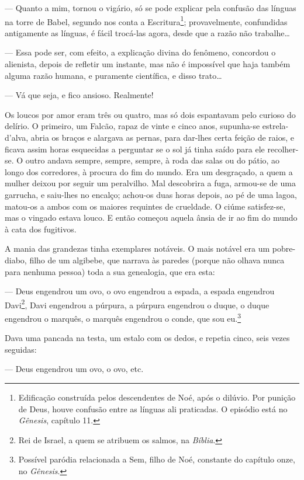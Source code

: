 --- Quanto a mim, tornou o vigário, só se pode explicar pela confusão
das línguas na torre de Babel, segundo nos conta a Escritura\footnote{Edificação
  construída pelos descendentes de Noé, após o dilúvio. Por punição de
  Deus, houve confusão entre as línguas ali praticadas. O episódio está
  no \emph{Gênesis}, capítulo 11.}; provavelmente, confundidas
antigamente as línguas, é fácil trocá-las agora, desde que a razão não
trabalhe\ldots{}

--- Essa pode ser, com efeito, a explicação divina do fenômeno,
concordou o alienista, depois de refletir um instante, mas não é
impossível que haja também alguma razão humana, e puramente científica,
e disso trato\ldots{}

--- Vá que seja, e fico ansioso. Realmente!

Os loucos por amor eram três ou quatro, mas só dois espantavam pelo
curioso do delírio. O primeiro, um Falcão, rapaz de vinte e cinco anos,
supunha-se estrela-d'alva, abria os braços e alargava as pernas, para
dar-lhes certa feição de raios, e ficava assim horas esquecidas a
perguntar se o sol já tinha saído para ele recolher-se. O outro andava
sempre, sempre, sempre, à roda das salas ou do pátio, ao longo dos
corredores, à procura do fim do mundo. Era um desgraçado, a quem a
mulher deixou por seguir um peralvilho. Mal descobrira a fuga, armou-se
de uma garrucha, e saiu-lhes no encalço; achou-os duas horas depois, ao
pé de uma lagoa, matou-os a ambos com os maiores requintes de crueldade.
O ciúme satisfez-se, mas o vingado estava louco. E então começou aquela
ânsia de ir ao fim do mundo à cata dos fugitivos.

A mania das grandezas tinha exemplares notáveis. O mais notável era um
pobre-diabo, filho de um algibebe, que narrava às paredes (porque não
olhava nunca para nenhuma pessoa) toda a sua genealogia, que era esta:

--- Deus engendrou um ovo, o ovo engendrou a espada, a espada engendrou
Davi\footnote{Rei de Israel, a quem se atribuem os salmos, na
  \emph{Bíblia}.}, Davi engendrou a púrpura, a púrpura engendrou o
duque, o duque engendrou o marquês, o marquês engendrou o conde, que sou
eu.\footnote{Possível paródia relacionada a Sem, filho de Noé, constante
  do capítulo onze, no \emph{Gênesis}.}

Dava uma pancada na testa, um estalo com os dedos, e repetia cinco, seis
vezes seguidas:

--- Deus engendrou um ovo, o ovo, etc.


